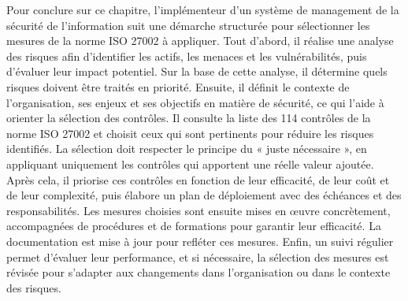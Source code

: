 Pour conclure sur ce chapitre, l’implémenteur d’un système de management de la sécurité de l’information suit une démarche structurée pour sélectionner les mesures de la norme ISO 27002 à appliquer. 
Tout d’abord, il réalise une analyse des risques afin d’identifier les actifs, les menaces et les vulnérabilités, puis d’évaluer leur impact potentiel. Sur la base de cette analyse, il détermine quels risques doivent être traités en priorité. 
Ensuite, il définit le contexte de l’organisation, ses enjeux et ses objectifs en matière de sécurité, ce qui l’aide à orienter la sélection des contrôles. Il consulte la liste des 114 contrôles de la norme ISO 27002 et choisit ceux qui sont pertinents pour réduire les risques identifiés. La sélection doit respecter le principe du « juste nécessaire », en appliquant uniquement les contrôles qui apportent une réelle valeur ajoutée. Après cela, il priorise ces contrôles en fonction de leur efficacité, de leur coût et de leur complexité, puis élabore un plan de déploiement avec des échéances et des responsabilités. Les mesures choisies sont ensuite mises en œuvre concrètement, accompagnées de procédures et de formations pour garantir leur efficacité. La documentation est mise à jour pour refléter ces mesures. 
Enfin, un suivi régulier permet d’évaluer leur performance, et si nécessaire, la sélection des mesures est révisée pour s’adapter aux changements dans l’organisation ou dans le contexte des risques.



